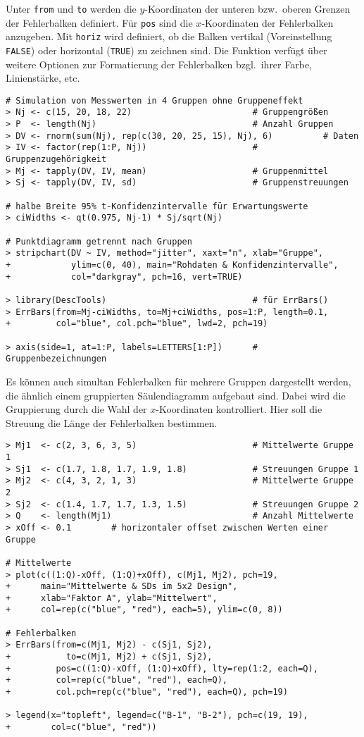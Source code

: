 Unter \lstinline!from! und \lstinline!to! werden die $y$-Koordinaten der unteren bzw.\ oberen Grenzen der Fehlerbalken definiert. Für \lstinline!pos! sind die $x$-Koordinaten der Fehlerbalken anzugeben.  Mit \lstinline!horiz! wird definiert, ob die Balken vertikal (Voreinstellung \lstinline!FALSE!) oder horizontal (\lstinline!TRUE!) zu zeichnen sind. Die Funktion verfügt über weitere Optionen zur Formatierung der Fehlerbalken bzgl.\ ihrer Farbe, Linienstärke, etc.
\begin{lstlisting}
# Simulation von Messwerten in 4 Gruppen ohne Gruppeneffekt
> Nj <- c(15, 20, 18, 22)                        # Gruppengrößen
> P  <- length(Nj)                               # Anzahl Gruppen
> DV <- rnorm(sum(Nj), rep(c(30, 20, 25, 15), Nj), 6)          # Daten
> IV <- factor(rep(1:P, Nj))                     # Gruppenzugehörigkeit
> Mj <- tapply(DV, IV, mean)                     # Gruppenmittel
> Sj <- tapply(DV, IV, sd)                       # Gruppenstreuungen

# halbe Breite 95% t-Konfidenzintervalle für Erwartungswerte
> ciWidths <- qt(0.975, Nj-1) * Sj/sqrt(Nj)

# Punktdiagramm getrennt nach Gruppen
> stripchart(DV ~ IV, method="jitter", xaxt="n", xlab="Gruppe",
+            ylim=c(0, 40), main="Rohdaten & Konfidenzintervalle",
+            col="darkgray", pch=16, vert=TRUE)

> library(DescTools)                             # für ErrBars()
> ErrBars(from=Mj-ciWidths, to=Mj+ciWidths, pos=1:P, length=0.1,
+         col="blue", col.pch="blue", lwd=2, pch=19)

> axis(side=1, at=1:P, labels=LETTERS[1:P])      # Gruppenbezeichnungen
\end{lstlisting}

Es können auch simultan Fehlerbalken für mehrere Gruppen dargestellt werden, die ähnlich einem gruppierten Säulendiagramm aufgebaut sind. Dabei wird die Gruppierung durch die Wahl der $x$-Koordinaten kontrolliert. Hier soll die Streuung die Länge der Fehlerbalken bestimmen.
\begin{lstlisting}
> Mj1  <- c(2, 3, 6, 3, 5)                       # Mittelwerte Gruppe 1
> Sj1  <- c(1.7, 1.8, 1.7, 1.9, 1.8)             # Streuungen Gruppe 1
> Mj2  <- c(4, 3, 2, 1, 3)                       # Mittelwerte Gruppe 2
> Sj2  <- c(1.4, 1.7, 1.7, 1.3, 1.5)             # Streuungen Gruppe 2
> Q    <- length(Mj1)                            # Anzahl Mittelwerte
> xOff <- 0.1        # horizontaler offset zwischen Werten einer Gruppe

# Mittelwerte
> plot(c((1:Q)-xOff, (1:Q)+xOff), c(Mj1, Mj2), pch=19,
+      main="Mittelwerte & SDs im 5x2 Design",
+      xlab="Faktor A", ylab="Mittelwert",
+      col=rep(c("blue", "red"), each=5), ylim=c(0, 8))

# Fehlerbalken
> ErrBars(from=c(Mj1, Mj2) - c(Sj1, Sj2),
+           to=c(Mj1, Mj2) + c(Sj1, Sj2),
+         pos=c((1:Q)-xOff, (1:Q)+xOff), lty=rep(1:2, each=Q),
+         col=rep(c("blue", "red"), each=Q),
+         col.pch=rep(c("blue", "red"), each=Q), pch=19)

> legend(x="topleft", legend=c("B-1", "B-2"), pch=c(19, 19),
+        col=c("blue", "red"))
\end{lstlisting}

